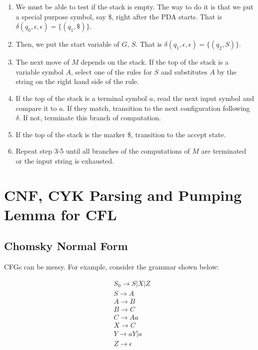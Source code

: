 \documentclass[11pt]{article}
\begin{document}
\begin{enumerate}

\item We must be able to test if the stack is empty. The way to do it is that we put a
special purpose symbol, say $\$$, right after the PDA starts. That is $\delta(q_0,\epsilon,\epsilon) = \{(q_1,\$)\}$.

\item Then, we put the start variable of $G$, $S$. That is
$\delta(q_1,\epsilon,\epsilon) = \{(q_2,S)\}$.

\item The next move of $M$ depends on the stack. If the top of the stack is a variable symbol $A$,
select one of the rules for $S$ and substitutes $A$ by the string on the right hand side of the
rule.

\item If the top of the stack is a terminal symbol $a$, read the next input symbol and compare it
to $a$. If they match, transition to the next configuration following $\delta$. If not, terminate
this branch of computation.

\item If the top of the stack is the marker $\$$, transition to the accept state.

\item Repeat step 3-5 until all branches of the computations of $M$ are terminated or the input
string is exhausted.

\end{enumerate}

\section{CNF, CYK Parsing and Pumping Lemma for CFL}

\subsection{Chomsky Normal Form}

CFGs can be messy. For example, consider the grammar shown below:

\begin{align*}
&S_0 \rightarrow S|X|Z \\
&S \rightarrow A \\
&A \rightarrow B \\
&B \rightarrow C \\
&C \rightarrow Aa \\
&X \rightarrow C \\
&Y \rightarrow aY|a \\
&Z \rightarrow \epsilon
\end{align*}
\end{document}
